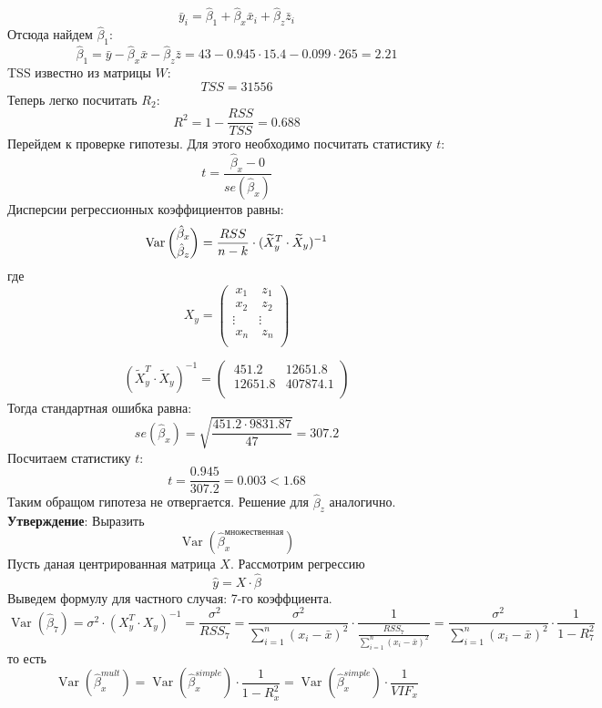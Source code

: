 \documentclass[12pt]{article} %
\theoremstyle{definition} %
\DeclareMathOperator{\Var}{Var}
\begin{document}
\[\bar{y}_i=\hat{\beta}_1+\hat{\beta}_x\bar{x}_i+\hat{\beta}_z\bar{z}_i\]
Отсюда найдем $\hat{\beta}_1$:
\[\hat{\beta}_1 = \bar{y} - \hat{\beta}_x\bar{x} - \hat{\beta}_z\bar{z} = 43 - 0.945\cdot15.4 - 0.099\cdot265 = 2.21\]    
TSS известно из матрицы $W$:
\[TSS = 31556\]
Теперь легко посчитать $R_2$:
\[R^2 = 1 - \dfrac{RSS}{TSS} = 0.688\]
Перейдем к проверке гипотезы. Для этого необходимо посчитать статистику $t$:
\[t = \dfrac{\hat{\beta}_x - 0}{se(\hat{\beta}_x)}\]
Дисперсии регрессионных коэффициентов равны:
\[\Var \dbinom{\hat{\beta}_x}{\hat{\beta}_z} = \dfrac{RSS}{n-k}\cdot{(\widetilde{X}^{T}_y \cdot \widetilde{X}_y)^{-1}}
\]
где \[
 X_y = \begin{pmatrix}
           \ x_{1} &\ z_{1}\\
           \ x_{2} &\ z_{2}\\
           \vdots & \vdots\\
           \ x_{n} &\ z_{n}\\
         \end{pmatrix}
         \]
         
\[(\widetilde{X}^{T}_y \cdot \widetilde{X}_y)^{-1} = \begin{pmatrix}
            \ 451.2 & 12651.8\\
            \ 12651.8 & 407874.1\\
        \end{pmatrix}
\]
Тогда стандартная ошибка равна:
\[se(\hat{\beta}_x) = \sqrt{\dfrac{451.2\cdot9831.87}{47}} = 307.2\]
Посчитаем статистику $t$:
\[t = \dfrac{0.945}{307.2} = 0.003 < 1.68\]
Таким обращом гипотеза не отвергается. Решение для $\hat{\beta}_z$ аналогично.\\

\textbf{Утверждение}: Выразить \[\Var(\hat{\beta}_x^{множественная})\] 
Пусть даная центрированная матрица $X$. Рассмотрим регрессию
\[\hat{y} = X\cdot{\hat\beta}\]
Выведем формулу для частного случая: 7-го коэффциента.
\[ \Var(\hat{\beta}_7) = \sigma^2\cdot(X^{T}_y \cdot X_y)^{-1} = \dfrac{\sigma^2}{RSS_7} = \dfrac{\sigma^2}{\sum\limits_{i=1}^n(x_i - \bar{x})^2}\cdot\dfrac{1}{\frac{RSS_7}{\sum\limits_{i=1}^n(x_i - \bar{x})^2}} = \dfrac{\sigma^2}{\sum\limits_{i=1}^n(x_i - \bar{x})^2}\cdot\dfrac{1}{1-R^2_7}\]
то есть
\[\Var(\hat{\beta}_x^{mult}) =  \Var(\hat{\beta}_x^{simple})\cdot\dfrac{1}{1 - R_x^2} = \Var(\hat{\beta}_x^{simple})\cdot\dfrac{1}{VIF_x}\]
\end{document}
